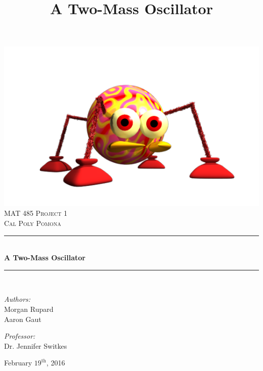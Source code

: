\documentclass[11pt, oneside]{article}   	%
\title{A Two-Mass Oscillator}
\newcommand{\HRule}{\rule{\linewidth}{0.5mm}}
\begin{document}
\frenchspacing
\begin{titlepage}
		\begin{center}
			\includegraphics[scale=0.2]{logo}\\[1cm]
			
			\textsc{\LARGE MAT 485 Project 1}\\[2cm]
			\textsc{\Large Cal Poly Pomona}\\[1cm]
			
		
			\HRule \\[0.4cm]
			{\huge \bfseries A Two-Mass Oscillator \\[0.4cm]}
			\HRule \\[2cm]
			
			\noindent
			\begin{minipage}{0.4\textwidth}
				\begin{flushleft}
					\large
					\emph{Authors:}\\
					Morgan Rupard \\ Aaron Gaut
				\end{flushleft}
			\end{minipage}
			\begin{minipage}{0.4\textwidth}
				\begin{flushright}
					\large
					\emph{Professor:}\\
					Dr. Jennifer Switkes
			\end{flushright}
			\end{minipage}
			
			\vfill
			
			{\large February $19^{\text{th}}$, 2016}
		\end{center}
	\end{titlepage}

\tableofcontents
\newpage
\end{document}
